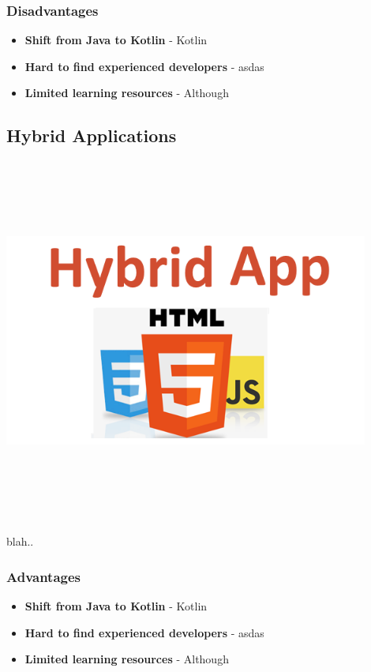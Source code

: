 \subsubsection{Disadvantages}
\begin{itemize}
    \item \textbf{Shift from Java to Kotlin} - Kotlin
    \item \textbf{Hard to find experienced developers} - asdas
    \item \textbf{Limited learning resources} - Although
\end{itemize}

\subsection{Hybrid Applications}
\par
\medskip
\begin{center}
    \includegraphics[width=12cm,height=12cm,keepaspectratio]{Images/hybridapp.png}
\end{center}

blah..


\subsubsection{Advantages}
\begin{itemize}
    \item \textbf{Shift from Java to Kotlin} - Kotlin
    \item \textbf{Hard to find experienced developers} - asdas
    \item \textbf{Limited learning resources} - Although
\end{itemize}
